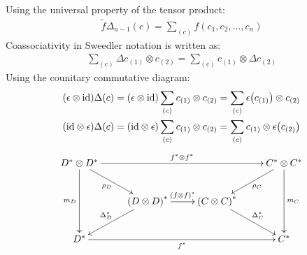 \documentclass{article}
\theoremstyle{definition}
\theoremstyle{remark}
\theoremstyle{underline}
\theoremstyle{underline}
\newcommand{\id}{\mathrm{id}}
\begin{document}
	Using the universal property of the tensor product:
	\begin{gather*}
		\tilde{f} \Delta_{n-1}(c) = \sum_{(c)} f(c_1, c_2, \dots, c_n)
	\end{gather*}
	Coassociativity in Sweedler notation is written as:
	\begin{gather*}
		\sum_{(c)} \Delta c_{(1)} \otimes c_{(2)} = \sum_{(c)} c_{(1)} \otimes \Delta c_{(2)}
	\end{gather*}
	Using the counitary commutative diagram:
	\begin{gather*}
		\pqty{\epsilon \otimes \id}\Delta(c) = \pqty{\epsilon \otimes \id} \sum_{(c)} c_{(1)} \otimes c_{(2)} = \sum_{(c)} \epsilon\pqty{c_{(1)}} \otimes c_{(2)} \\
		\pqty{\id \otimes \epsilon}\Delta(c) = \pqty{\id \otimes \epsilon} \sum_{(c)} c_{(1)} \otimes c_{(2)} = \sum_{(c)} c_{(1)} \otimes \epsilon\pqty{c_{(2)}} 
	\end{gather*}
	\begin{align*}
		\xymatrix{
			D^* \otimes D^* \ar[dd]_-{m_D} \ar[rd]_-{\rho_D} \ar[rrr]^-{f^* \otimes f^*} & & & C^* \otimes C^* \ar[ld]^-{\rho_C} \ar[dd]^-{m_C} \\
			& \pqty{D \otimes D}^* \ar[r]^-{\pqty{f \otimes f}^*} \ar[ld]_-{\Delta^*_D} & \pqty{C \otimes C}^* \ar[rd]^-{\Delta^*_C} & \\
			D^* \ar[rrr]_-{f^*} & & & C^*
		}
	\end{align*}
	
\end{document}
